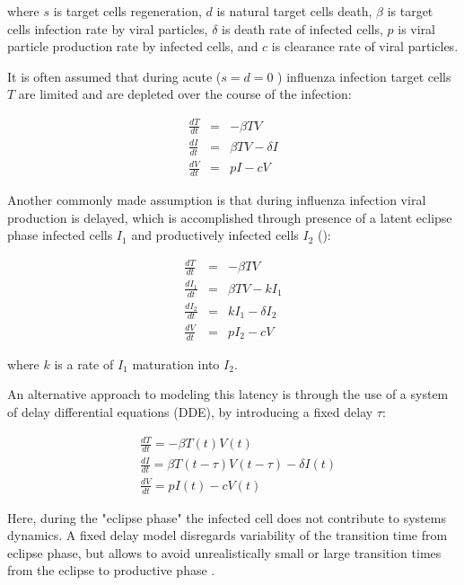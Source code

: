 where $s$ is target cells regeneration, $d$ is natural target cells death, $\beta$ is target cells infection rate by viral particles, $\delta$ is death rate of infected cells, $p$ is viral particle production rate by infected cells, and $c$ is clearance rate of viral particles.

It is often assumed that during acute ($s = d = 0$ \cite{baccam2006kinetics}) influenza infection target cells $T$ are limited and are depleted over the course of the infection:

\begin{equation}
\begin{array}{rcl}
\frac{dT}{dt} &=& - \beta T V \\
\frac{dI}{dt} &=& \beta T V - \delta I \\
\frac{dV}{dt} &=& p I - c V
\end{array}
\end{equation}

Another commonly made assumption is that during influenza infection viral production is delayed, which is accomplished through presence of a latent eclipse phase infected cells $I_1$ and productively infected cells $I_2$ (\cite{baccam2006kinetics, smith2011effect}):

\begin{equation}
\begin{array}{rcl}
\frac{dT}{dt} &=& - \beta T V \\
\frac{dI_1}{dt} &=& \beta T V - k I_1 \\
\frac{dI_2}{dt} &=& k I_1 - \delta I_2 \\
\frac{dV}{dt} &=& p I_2 - c V
\end{array}
\end{equation}

where $k$ is a rate of $I_1$ maturation into $I_2$.

An alternative approach to modeling this latency is through the use of a system of delay differential equations (DDE), by introducing a fixed delay $\tau$:

\begin{equation}
\begin{array}{rcl}
&\frac{dT}{dt} = - \beta T(t) V(t) \\
&\frac{dI}{dt} = \beta T(t-\tau) V(t-\tau) - \delta I(t) \\
&\frac{dV}{dt} = p I(t) - c V(t)
\end{array}
\end{equation}

Here, during the "eclipse phase" the infected cell does not contribute to systems dynamics. A fixed delay model disregards variability of the transition time from eclipse phase, but allows to avoid unrealistically small or large transition times from the eclipse to productive phase \cite{beauchemin2008modeling}.

